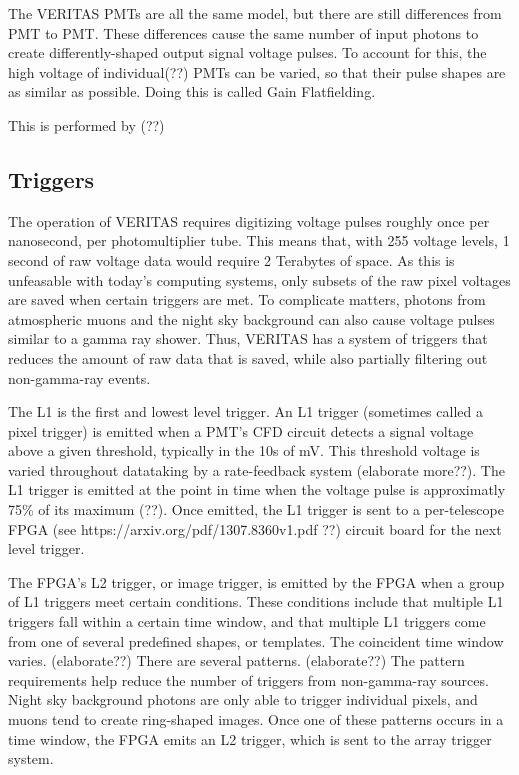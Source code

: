 The VERITAS PMTs are all the same model, but there are still differences from PMT to PMT.
These differences cause the same number of input photons to create differently-shaped output signal voltage pulses.
To account for this, the high voltage of individual(??) PMTs can be varied, so that their pulse shapes are as similar as possible.
Doing this is called Gain Flatfielding.

This is performed by (??)

\subsection{Triggers}\label{sec:trig}

The operation of VERITAS requires digitizing voltage pulses roughly once per nanosecond, per photomultiplier tube.
This means that, with 255 voltage levels, 1 second of raw voltage data would require 2 Terabytes of space.
As this is unfeasable with today's computing systems, only subsets of the raw pixel voltages are saved when certain triggers are met.
To complicate matters, photons from atmospheric muons and the night sky background can also cause voltage pulses similar to a gamma ray shower.
Thus, VERITAS has a system of triggers that reduces the amount of raw data that is saved, while also partially filtering out non-gamma-ray events.

The L1 is the first and lowest level trigger.
An L1 trigger (sometimes called a pixel trigger) is emitted when a PMT's CFD circuit detects a signal voltage above a given threshold, typically in the 10s of mV.
This threshold voltage is varied throughout datataking by a rate-feedback system (elaborate more??).
The L1 trigger is emitted at the point in time when the voltage pulse is approximatly 75\% of its maximum (??).
Once emitted, the L1 trigger is sent to a per-telescope FPGA (see https://arxiv.org/pdf/1307.8360v1.pdf ??) circuit board for the next level trigger.

The FPGA's L2 trigger, or image trigger, is emitted by the FPGA when a group of L1 triggers meet certain conditions.
These conditions include that multiple L1 triggers fall within a certain time window, and that multiple L1 triggers come from one of several predefined shapes, or templates.
The coincident time window varies. (elaborate??)
There are several patterns. (elaborate??)
The pattern requirements help reduce the number of triggers from non-gamma-ray sources.
Night sky background photons are only able to trigger individual pixels, and muons tend to create ring-shaped images.
Once one of these patterns occurs in a time window, the FPGA emits an L2 trigger, which is sent to the array trigger system.

